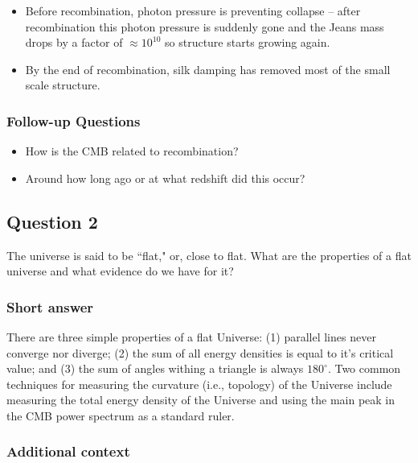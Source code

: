 \documentclass[a4paper,11pt]{article}
\begin{document}
\begin{itemize}
    \item Before recombination, photon pressure is preventing collapse -- after recombination this photon pressure is suddenly gone and the Jeans mass drops by a factor of $\approx 10^{10}$ so structure starts growing again.
    \item By the end of recombination, silk damping has removed most of the small scale structure.
\end{itemize}

\subsubsection{Follow-up Questions}

\begin{itemize}
    \item How is the CMB related to recombination?
    \item Around how long ago or at what redshift did this occur?
\end{itemize}

%
%

\newpage
\subsection{Question 2}

The universe is said to be ``flat," or, close to flat. What are the properties of a flat universe and what evidence do we have for it?

\subsubsection{Short answer}

There are three simple properties of a flat Universe: (1) parallel lines never converge nor diverge; (2) the sum of all energy densities is equal to it's critical value; and (3) the sum of angles withing a triangle is always $180^\circ$. Two common techniques for measuring the curvature (i.e., topology) of the Universe include measuring the total energy density of the Universe and using the main peak in the CMB power spectrum as a standard ruler.

\subsubsection{Additional context}
\end{document}
